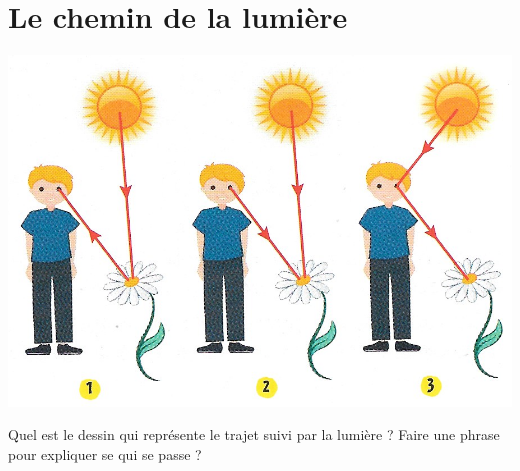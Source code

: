 \documentclass[a4paper,11pt]{exam}
\begin{document}

%
%

\label{LastPage}
\section{Le chemin de la lumière}

\begin{multicols}{2}
	
	\includegraphics[scale=0.3]{exo_trajet_lumiere}
	
	\begin{questions}
		\question Quel est le dessin qui représente le trajet suivi par la lumière ?
		\question Faire une phrase pour expliquer se qui se passe ?
	\end{questions}	
\end{multicols}
\end{document}
